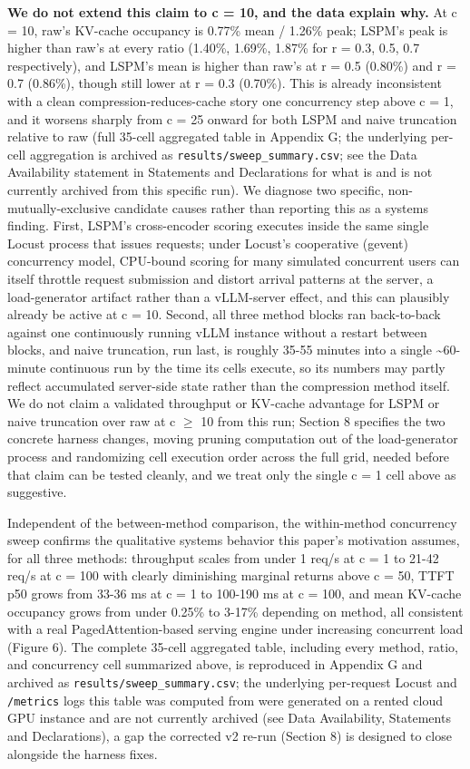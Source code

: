 \textbf{We do not extend this claim to c = 10, and the data explain why.} At c = 10, raw's KV-cache occupancy is 0.77\% mean / 1.26\% peak; LSPM's peak is higher than raw's at every ratio (1.40\%, 1.69\%, 1.87\% for r = 0.3, 0.5, 0.7 respectively), and LSPM's mean is higher than raw's at r = 0.5 (0.80\%) and r = 0.7 (0.86\%), though still lower at r = 0.3 (0.70\%). This is already inconsistent with a clean compression-reduces-cache story one concurrency step above c = 1, and it worsens sharply from c = 25 onward for both LSPM and naive truncation relative to raw (full 35-cell aggregated table in Appendix G; the underlying per-cell aggregation is archived as \texttt{results/sweep\_summary.csv}; see the Data Availability statement in Statements and Declarations for what is and is not currently archived from this specific run). We diagnose two specific, non-mutually-exclusive candidate causes rather than reporting this as a systems finding. First, LSPM's cross-encoder scoring executes inside the same single Locust process that issues requests; under Locust's cooperative (gevent) concurrency model, CPU-bound scoring for many simulated concurrent users can itself throttle request submission and distort arrival patterns at the server, a load-generator artifact rather than a vLLM-server effect, and this can plausibly already be active at c = 10. Second, all three method blocks ran back-to-back against one continuously running vLLM instance without a restart between blocks, and naive truncation, run last, is roughly 35-55 minutes into a single \textasciitilde{}60-minute continuous run by the time its cells execute, so its numbers may partly reflect accumulated server-side state rather than the compression method itself. We do not claim a validated throughput or KV-cache advantage for LSPM or naive truncation over raw at c $\geq$ 10 from this run; Section 8 specifies the two concrete harness changes, moving pruning computation out of the load-generator process and randomizing cell execution order across the full grid, needed before that claim can be tested cleanly, and we treat only the single c = 1 cell above as suggestive.

Independent of the between-method comparison, the within-method concurrency sweep confirms the qualitative systems behavior this paper's motivation assumes, for all three methods: throughput scales from under 1 req/s at c = 1 to 21-42 req/s at c = 100 with clearly diminishing marginal returns above c = 50, TTFT p50 grows from 33-36 ms at c = 1 to 100-190 ms at c = 100, and mean KV-cache occupancy grows from under 0.25\% to 3-17\% depending on method, all consistent with a real PagedAttention-based serving engine under increasing concurrent load (Figure 6). The complete 35-cell aggregated table, including every method, ratio, and concurrency cell summarized above, is reproduced in Appendix G and archived as \texttt{results/sweep\_summary.csv}; the underlying per-request Locust and \texttt{/metrics} logs this table was computed from were generated on a rented cloud GPU instance and are not currently archived (see Data Availability, Statements and Declarations), a gap the corrected v2 re-run (Section 8) is designed to close alongside the harness fixes.

